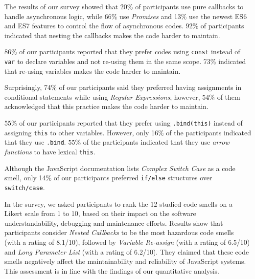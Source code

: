 The results of our survey showed that 20\% of participants use pure callbacks to handle asynchronous logic, while 66\% use \emph{Promises} and 13\% use the newest ES6 and ES7 features to control the flow of asynchronous codes. 92\% of participants indicated that nesting the callbacks makes the code harder to maintain.

86\% of our participants reported that they prefer codes using \texttt{const} instead of \texttt{var} to declare variables and not re-using them in the same scope. 73\% indicated that re-using variables makes the code harder to maintain.

Surprisingly, 74\% of our participants said they preferred having assignments in conditional statements while using \emph{Regular Expressions}, however, 54\% of them acknowledged that this practice makes the code harder to maintain.

55\% of our participants reported that they prefer using \texttt{.bind(this)} instead of assigning \texttt{this} to other variables. However, only 16\% of the participants indicated that they use \texttt{.bind}. 55\% of the participants indicated that they use \emph{arrow functions} to have lexical \texttt{this}.

Although the JavaScript documentation lists \emph{Complex Switch Case} as a code smell, only 14\% of our participants preferred \texttt{if/else} structures over \texttt{switch/case}.

In the survey, we asked participants to rank the 12 studied code smells on a Likert scale from 1 to 10, based on their impact on the software understandability, debugging and maintenance efforts. Results show that participants consider \emph{Nested Callbacks} to be the most hazardous code smells (with a rating of 8.1/10), followed by \emph{Variable Re-assign} (with a rating of 6.5/10) and \emph{Long Parameter List} (with a rating of 6.2/10). They claimed that these code smells negatively affect the maintainability and reliability of JavaScript systems. This assessment is in line with the findings of our quantitative analysis.



